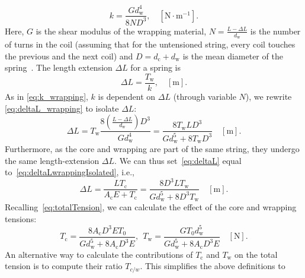 \documentclass{article}
\begin{document}
\begin{sloppy}
%
\begin{equation}\label{eq:k_wrapping}
    k = \frac{Gd_\text{w}^4}{8ND^3}, \quad [\text{N}\cdot\text{m}^{-1}].
\end{equation}
%
Here, $G$ is the shear modulus of the wrapping material, $N = \frac{L - \Delta L}{d_\text{w}}$ is the number of turns in the coil (assuming that for the untensioned string, every coil touches the previous and the next coil) and $D = d_\text{c}+d_\text{w}$ is the mean diameter of the spring~\cite{kemp:wound_and_unwound_strings}.
%
The length extension $\Delta L$ for a spring is
%
\begin{equation}\label{eq:deltaL_wrapping}
    \Delta L = \frac{T_\text{w}}{k}, \quad [\text{m}].
\end{equation}
%
As in \eqref{eq:k_wrapping}, $k$ is dependent on $\Delta L$ (through variable $N$), we rewrite  \eqref{eq:deltaL_wrapping} to isolate $\Delta L$:
\begin{equation}\label{eq:deltaLwrappingIsolated}
    \Delta L = T_\text{w}\frac{8(\frac{L - \Delta L}{d_\text{w}})D^3}{Gd_\text{w}^4} = \frac{8T_\text{w}LD^3}{Gd_\text{w}^5 + 8T_\text{w}D^3} \quad [\text{m}].
\end{equation}
Furthermore, as the core and wrapping are part of the same string, they undergo the same length-extension $\Delta L$. We can thus set~\eqref{eq:deltaL} equal to~\eqref{eq:deltaLwrappingIsolated}, i.e., 
%
\begin{equation}\label{eq:deltaLtw}
    \Delta L = \frac{LT_\text{c}}{A_\text{c}E + T_\text{c}} = \frac{8D^3LT_\text{w}}{Gd_\text{w}^5 + 8D^3T_\text{w}} \quad [\text{m}].
\end{equation}
%
Recalling~\eqref{eq:totalTension}, we can calculate the effect of the core and wrapping tensions:
%
\begin{equation}
    T_\text{c} = \frac{8A_\text{c}D^3ET_0}{Gd_\text{w}^5+8A_\text{c}D^3E}, \ \ 
    T_\text{w} = \frac{GT_0d_\text{w}^5}{Gd_\text{w}^5 + 8A_\text{c}D^3E} \quad [\text{N}].
\end{equation}
%
An alternative way to calculate the contributions of $T_\text{c}$ and $T_\text{w}$ on the total tension is to compute their ratio $T_{c/w}$. This simplifies the above definitions to
%
\begin{equation}

\end{equation}
\end{sloppy}
\end{document}
